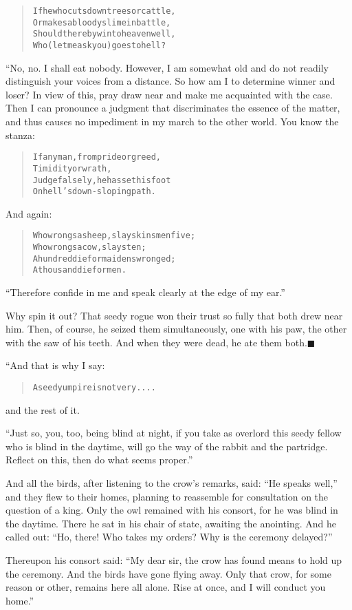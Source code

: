 \documentclass[article, twoside, 14pt]{memoir}
\newcommand{\qed}{\hfill \ensuremath{\blacksquare}}
\renewenvironment{verbatim}{%
\begin{quote}%
\vskip -10pt%
\begin{alltt}\normalfont\large}{\end{alltt}%
\end{quote}%
\vskip -10pt
} %
\begin{document}
\begin{verbatim}
If he who cuts down trees or cattle,
Or makes a bloody slime in battle,
Should thereby win to heaven{\textemdash}well,
Who (let me ask you) goes to hell?
\end{verbatim}
“No, no. I shall eat nobody. However, I am somewhat old and do not
readily distinguish your voices from a distance. So how am I to
determine winner and loser? In view of this, pray draw near and
make me acquainted with the case. Then I can pronounce a judgment
that discriminates the essence of the matter, and thus causes no
impediment in my march to the other world. You know the stanza:

\begin{verbatim}
If any man, from pride or greed,
    Timidity or wrath,
Judge falsely, he has set his foot
    On hell's down-sloping path.
\end{verbatim}
And again:

\begin{verbatim}
Who wrongs a sheep, slays kinsmen five;
    Who wrongs a cow, slays ten;
A hundred die for maidens wronged;
    A thousand die for men.
\end{verbatim}
``Therefore confide in me and speak clearly at the edge of my ear.''

Why spin it out? That seedy rogue won their trust so fully that
both drew near him. Then, of course, he seized them simultaneously,
one with his paw, the other with the saw of his teeth. And when
they were dead, he ate them both.\hyperref[s50]{\qed}

“And that is why I say:

\begin{verbatim}
A seedy umpire is not very. . . .
\end{verbatim}
and the rest of it.

``Just so, you, too, being blind at night, if you take as overlord this seedy fellow who is blind in the daytime, will go the way of the rabbit and the partridge. Reflect on this, then do what seems proper.''

And all the birds, after listening to the crow's remarks, said:
``He speaks well,'' and they flew to their homes, planning to
reassemble for consultation on the question of a king. Only the owl
remained with his consort, for he was blind in the daytime. There
he sat in his chair of state, awaiting the anointing. And he called
out:
``Ho, there! Who takes my orders? Why is the ceremony delayed?''

Thereupon his consort said:
``My dear sir, the crow has found means to hold up the ceremony. And the birds have gone flying away. Only that crow, for some reason or other, remains here all alone. Rise at once, and I will conduct you home.''
\end{document}
